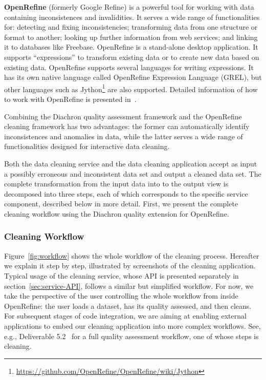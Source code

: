 \textbf{OpenRefine} (formerly Google Refine) is a powerful tool for working with data containing inconsistences and invalidities. 
It serves a wide range of functionalities for: detecting and fixing inconsistencies; transforming data from one structure or format to another; looking up further information from web services; and linking it to databases like Freebase.
OpenRefine  is a stand-alone desktop application. 
It supports ``expressions'' to transform existing data or to create new data based on existing data.
OpenRefine supports several languages for writing expressions. It has its own native language called OpenRefine Expression Language (GREL), but other languages such as Jython\footnote{\url{https://github.com/OpenRefine/OpenRefine/wiki/Jython}} are also supported. Detailed information of how to work with OpenRefine is presented in~\cite{verborgh_packt_2013}.

Combining the Diachron quality assessment framework and the OpenRefine cleaning framework has two advantages: the former can automatically identify inconsistences and anomalies in data, while the latter serves a wide range of functionalities designed for interactive data cleaning.

Both the data cleaning service and the data cleaning application accept as input a possibly erroneous and inconsistent data set and output a cleaned data set.
The complete transformation from the input data into to the output view is decomposed into three steps, each of which corresponds to the specific service component, described below in more detail.
First, we present the complete cleaning workflow using the Diachron quality extension for OpenRefine.

\subsubsection{Cleaning Workflow}
\label{sec:workflow}

Figure~\ref{fig:workflow} shows the whole workflow of the cleaning process.
Hereafter we explain it step by step, illustrated by screenshots of the cleaning application.
Typical usage of the cleaning service, whose API is presented separately in section~\ref{sec:service-API}, follows a similar but simplified workflow.
For now, we take the perspective of the user controlling the whole workflow from inside OpenRefine: the user loads a dataset, has its quality assessed, and then cleans.
For subsequent stages of code integration, we are aiming at enabling external applications to embed our cleaning application into more complex workflows.
See, e.g., Deliverable 5.2~\cite[section~4.3]{diachron-d5.2} for a full quality assessment workflow, one of whose steps is cleaning.

